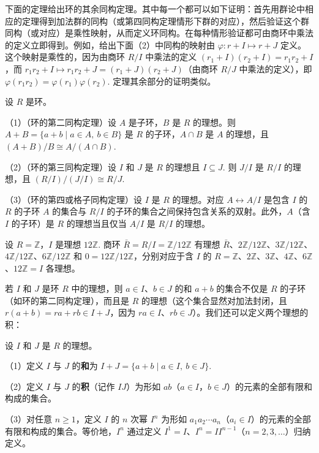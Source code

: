 下面的定理给出环的其余同构定理。其中每一个都可以如下证明：首先用群论中相应的定理得到加法群的同构（或第四同构定理情形下群的对应），然后验证这个群同构（或对应）是乘性映射，从而定义环同构。在每种情形验证都可由商环中乘法的定义立即得到。例如，给出下面（2）中同构的映射由 \(\varphi : r+I \mapsto r+J\) 定义。这个映射是乘性的，因为由商环 \(R/I\) 中乘法的定义 \((r_1+I)(r_2+I) = r_1r_2+I\)，而 \(r_1r_2+I \mapsto r_1r_2+J = (r_1+J)(r_2+J)\)（由商环 \(R/J\) 中乘法的定义），即 \(\varphi(r_1r_2) = \varphi(r_1)\varphi(r_2)\). 定理其余部分的证明类似。

\begin{theorem}\label{thm:7.8}
设 \(R\) 是环。

（1）（环的第二同构定理）设 \(A\) 是子环，\(B\) 是 \(R\) 的理想。则 \(A+B = \{a+b \mid a \in A,\ b \in B\}\) 是 \(R\) 的子环，\(A \cap B\) 是 \(A\) 的理想，且 \((A+B)/B \cong A/(A \cap B)\).

（2）（环的第三同构定理）设 \(I\) 和 \(J\) 是 \(R\) 的理想且 \(I \subseteq J\). 则 \(J/I\) 是 \(R/I\) 的理想，且 \((R/I)/(J/I) \cong R/J\).

（3）（环的第四或格子同构定理）设 \(I\) 是 \(R\) 的理想。对应 \(A \leftrightarrow A/I\) 是包含 \(I\) 的 \(R\) 的子环 \(A\) 的集合与 \(R/I\) 的子环的集合之间保持包含关系的双射。此外，\(A\)（含 \(I\) 的子环）是 \(R\) 的理想当且仅当 \(A/I\) 是 \(R/I\) 的理想。
\end{theorem}

设 \(R = \mathbb{Z}\)，\(I\) 是理想 \(12\mathbb{Z}\). 商环 \(\bar{R} = R/I = \mathbb{Z}/12\mathbb{Z}\) 有理想 \(\bar{R}\)、\(2\mathbb{Z}/12\mathbb{Z}\)、\(3\mathbb{Z}/12\mathbb{Z}\)、\(4\mathbb{Z}/12\mathbb{Z}\)、\(6\mathbb{Z}/12\mathbb{Z}\) 和 \(0 = 12\mathbb{Z}/12\mathbb{Z}\)，分别对应于含 \(I\) 的 \(R = \mathbb{Z}\)、\(2\mathbb{Z}\)、\(3\mathbb{Z}\)、\(4\mathbb{Z}\)、\(6\mathbb{Z}\)、\(12\mathbb{Z} = I\) 各理想。

若 \(I\) 和 \(J\) 是环 \(R\) 中的理想，则 \(a \in I\)、\(b \in J\) 的和 \(a+b\) 的集合不仅是 \(R\) 的子环（如环的第二同构定理），而且是 \(R\) 的理想（这个集合显然对加法封闭，且 \(r(a+b) = ra+rb \in I+J\)，因为 \(ra \in I\)、\(rb \in J\)）。我们还可以定义两个理想的积：

\begin{definition}
设 \(I\) 和 \(J\) 是 \(R\) 的理想。

（1）定义 \(I\) 与 \(J\) 的\textbf{和}为 \(I+J = \{a+b \mid a \in I,\ b \in J\}\).

（2）定义 \(I\) 与 \(J\) 的\textbf{积}（记作 \(IJ\)）为形如 \(ab\)（\(a \in I\)，\(b \in J\)）的元素的全部有限和构成的集合。

（3）对任意 \(n \geq 1\)，定义 \(I\) 的 \(n\) 次幂 \(I^n\) 为形如 \(a_1a_2\cdots a_n\)（\(a_i \in I\)）的元素的全部有限和构成的集合。等价地，\(I^n\) 通过定义 \(I^1 = I\)、\(I^n = II^{n-1}\)（\(n = 2, 3, \ldots\)）归纳定义。
\end{definition}

